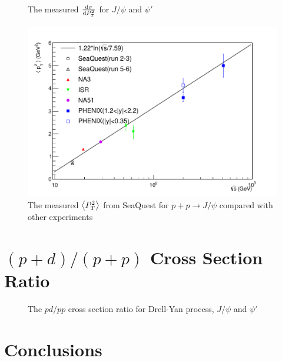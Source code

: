 \documentclass[reprint,aps,unsortedaddress,superscriptaddress,prd,floatfix,showpacs,linenumbers]{revtex4-2}
\begin{document}
\begin{figure}
	\caption{The measured $\dv{\sigma}{P_T^2}$ for $J/\psi$ and $\psi'$}
	\label{fig:pT_cross_sections}
\end{figure}

\begin{figure}
	\centering
	\includegraphics[width=\linewidth]{crossSections/pT/pT_s_release}
	\caption{The measured $\expval{P_T^2}$ from SeaQuest for $p+p\rightarrow J/\psi$ compared with other experiments \cite{clark1978,drapier1998,acharya2020}}
	\label{fig:pt_s}
\end{figure}

\section{$(p+d)/(p+p)$ Cross Section Ratio}
\label{sec:CSR}
\begin{figure}
	\caption{The $pd/pp$ cross section ratio for Drell-Yan process, $J/\psi$ and $\psi'$}
	\label{fig:pd/pp_csr}
\end{figure}

\section{Conclusions}
\label{sec:Conclusions}

\nocite{*}

\end{document}
